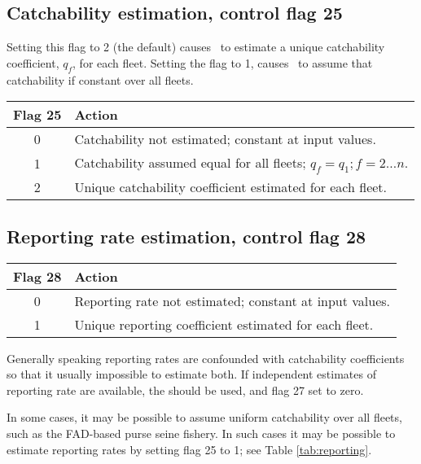 \subsection*{Catchability estimation, control flag 25}
Setting this flag to 2 (the default) causes \TE\ to estimate a unique
catchability coefficient, $q_f$, for each fleet. Setting the flag to
1, causes \TE\ to assume that catchability if constant over all
fleets.
\begin{center}
\begin{tabular}{cp{4.0in}}
\hline
Flag 25 & Action\\
\hline
 0 & Catchability not estimated; constant at input values.\\
 1 & Catchability assumed equal for all fleets; $q_f = q_1; f = 2 \dots n$.\\
 2 & Unique catchability coefficient estimated for each fleet.\\
\hline
\end{tabular}
\end{center}


\subsection*{Reporting rate estimation, control flag 28}
\begin{center}
\begin{tabular}{cp{4.0in}}
\hline
Flag 28 & Action\\
\hline
 0 & Reporting rate not estimated; constant at input values.\\
 1 & Unique reporting coefficient estimated for each fleet.\\
\hline
\end{tabular}
\end{center}
Generally speaking reporting rates are confounded with catchability
coefficients so that it usually impossible to estimate both. If
independent estimates of reporting rate are available, the should be
used, and flag 27 set to zero.

In some cases, it may be possible to assume uniform catchability over
all fleets, such as the FAD-based purse seine fishery. In such cases
it may be possible to estimate reporting rates by setting flag 25 to
1; see Table \ref{tab:reporting}.

